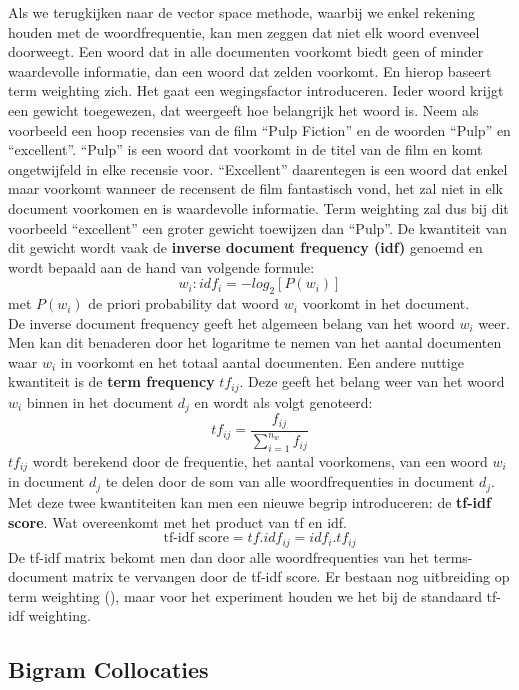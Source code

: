 Als we terugkijken naar de vector space methode, waarbij we enkel rekening houden met de woordfrequentie, kan men zeggen dat niet elk woord evenveel doorweegt. Een woord dat in alle documenten voorkomt biedt geen of minder waardevolle informatie, dan een woord dat zelden voorkomt. En hierop baseert term weighting zich. Het gaat een wegingsfactor introduceren. Ieder woord krijgt een gewicht toegewezen, dat weergeeft hoe belangrijk het woord is. Neem als voorbeeld een hoop recensies van de film ``Pulp Fiction'' en de woorden ``Pulp'' en ``excellent''. ``Pulp'' is een woord dat voorkomt in de titel van de film en komt ongetwijfeld in elke recensie voor. ``Excellent'' daarentegen is een woord dat enkel maar voorkomt wanneer de recensent de film fantastisch vond, het zal niet in elk document voorkomen en is waardevolle informatie. Term weighting zal dus bij dit voorbeeld ``excellent'' een groter gewicht toewijzen dan ``Pulp''. 
%
De kwantiteit van dit gewicht wordt vaak de \textbf{inverse document frequency  (idf)} genoemd en wordt bepaald aan de hand van volgende formule:
\[w_{i}: idf_{i} = -log_{2}[P(w_{i})] \]
met $P(w_{i})$ de priori probability dat woord $w_{i}$ voorkomt in het document.\\
%
De inverse document frequency geeft het algemeen belang van het woord $w_{i}$ weer. Men kan dit benaderen door het logaritme te nemen van het aantal documenten waar $w_{i}$ in voorkomt en het totaal aantal documenten.
Een andere nuttige kwantiteit is de  \textbf{term frequency} $tf_{ij}$. Deze geeft het belang weer van het woord $w_{i}$ binnen in het document $d_{j}$  en wordt als volgt genoteerd:
\[ tf_{ij} = \frac{f_{ij}}{ \sum_{i=1}^{n_{w}}f_{ij}} \]
%
$tf_{ij}$ wordt berekend door de frequentie, het aantal voorkomens, van een woord $w_{i}$ in document $d_{j}$ te delen door de som van alle woordfrequenties in document $d_{j}$.
Met deze twee kwantiteiten kan men een nieuwe begrip introduceren: de \textbf{tf-idf score}. Wat overeenkomt met het product van tf en idf.
\[ \text{tf-idf score} = tf . idf_{ij} = idf_{i} . tf_{ij} \]
%
De tf-idf matrix bekomt men dan door alle woordfrequenties van het terms-document matrix te vervangen door de tf-idf score.
Er bestaan nog uitbreiding op term weighting (\cite{altoglou2010study}), maar voor het experiment houden we het bij de standaard tf-idf weighting.


\subsection{Bigram Collocaties}\label{Bigram Collocaties}

